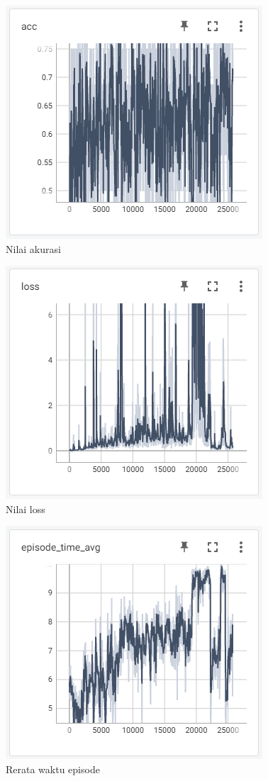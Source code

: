 \begin{figure}[H] 
	\centering
	\includegraphics[width=.7\linewidth]{images/acc}
	\caption{Nilai akurasi}
	\label{fig:acc}
\end{figure}
\begin{figure}[H] 
	\centering
	\includegraphics[width=.7\linewidth]{images/loss}
	\caption{Nilai loss}
	\label{fig:loss}
\end{figure}
\begin{figure}[H] 
	\centering
	\includegraphics[width=.7\linewidth]{images/episode_time_avg}
	\caption{Rerata waktu episode}
	\label{fig:episode_time_avg}
\end{figure}
